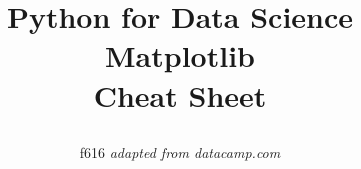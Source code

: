 \documentclass[10pt,a4paper]{article}
\title{
\raggedright
{\textbf{\color{black} Python for Data Science\\
\color{alert}Matplotlib}}
\color{black}\large\\Cheat Sheet}
\author{f616 \emph{adapted from datacamp.com}}
\date{}
\begin{document}
\small
\begin{multicols}{2}

\maketitle
\thispagestyle{empty}
\scriptsize






\end{multicols}
\end{document}
